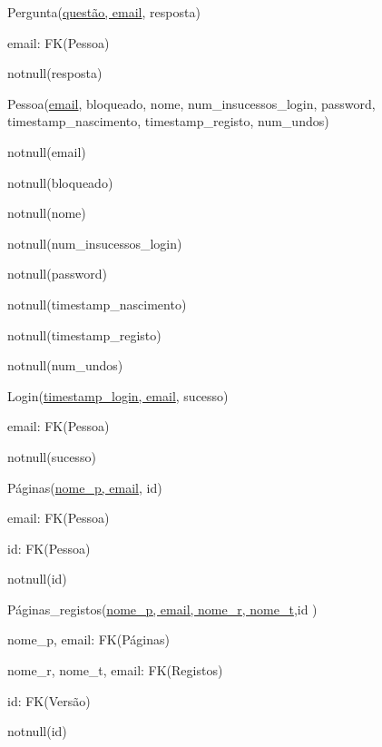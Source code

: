 \documentclass[11pt,a4paper]{article}
\begin{document}
\begin{description}[noitemsep]
	\item Pergunta(\underline{quest\~ao, email}, resposta)
	\item email: FK(Pessoa)
	\item notnull(resposta)
\end{description}

\begin{description}[noitemsep]
	\item Pessoa(\underline{email}, bloqueado, nome, num\_insucessos\_login, password, timestamp\_nascimento, timestamp\_registo, num\_undos)
	\item notnull(email)
	\item notnull(bloqueado)
	\item notnull(nome)
	\item notnull(num\_insucessos\_login)
	\item notnull(password)
	\item notnull(timestamp\_nascimento)
	\item notnull(timestamp\_registo)
	\item notnull(num\_undos)
\end{description}

\begin{description}[noitemsep]
	\item Login(\underline{timestamp\_login, email}, sucesso)
	\item email: FK(Pessoa)
	\item notnull(sucesso)
\end{description}

\begin{description}[noitemsep]
	\item P\'{a}ginas(\underline{nome\_p, email}, id)
	\item email: FK(Pessoa)
	\item id: FK(Pessoa)
	\item notnull(id)
\end{description}

\begin{description}[noitemsep]
	\item P\'{a}ginas\_registos(\underline{nome\_p, email, nome\_r, nome\_t},id )
	\item nome\_p, email: FK(P\'{a}ginas)
	\item nome\_r, nome\_t, email: FK(Registos)
	\item id: FK(Vers\~{a}o)
	\item notnull(id)
\end{description}
\end{document}
